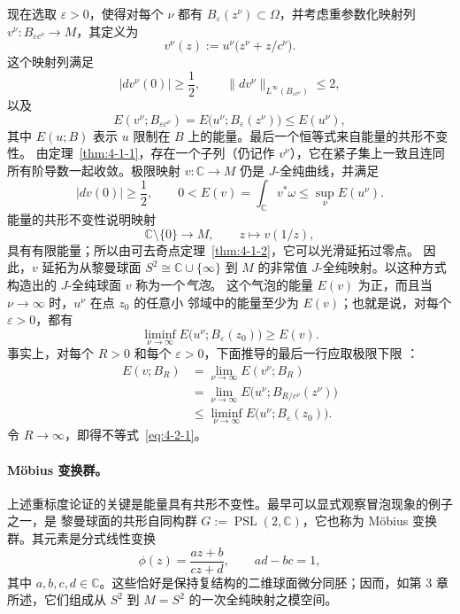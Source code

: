 现在选取 $\varepsilon>0$，使得对每个 $\nu$ 都有
$B_\varepsilon(z^\nu)\subset\Omega$，并考虑重参数化映射列
$v^\nu:B_{\varepsilon c^\nu}\to M$，其定义为
\[
  v^\nu(z):=u^\nu\bigl(z^\nu+z/c^\nu\bigr).
\]
这个映射列满足
\[
  |dv^\nu(0)|\ge\frac12,
  \qquad
  \lVert dv^\nu\rVert_{L^\infty(B_{\varepsilon c^\nu})}\le2,
\]
以及
\[
  E(v^\nu;B_{\varepsilon c^\nu})
  =E\bigl(u^\nu;B_\varepsilon(z^\nu)\bigr)
  \le E(u^\nu),
\]
其中 $E(u;B)$ 表示 $u$ 限制在 $B$ 上的能量。最后一个恒等式来自能量的共形不变性。
由定理~\ref{thm:4-1-1}，存在一个子列（仍记作 $v^\nu$），它在紧子集上一致且连同
所有阶导数一起收敛。极限映射 $v:\mathbb C\to M$ 仍是 $J$-全纯曲线，并满足
\[
  |dv(0)|\ge\frac12,
  \qquad
  0<E(v)=\int_{\mathbb C}v^*\omega
  \le\sup_\nu E(u^\nu).
\]
能量的共形不变性说明映射
\[
  \mathbb C\setminus\{0\}\longrightarrow M,
  \qquad z\longmapsto v(1/z),
\]
具有有限能量；所以由可去奇点定理~\ref{thm:4-1-2}，它可以光滑延拓过零点。
因此，$v$ 延拓为从黎曼球面 $S^2\cong\mathbb C\cup\{\infty\}$ 到 $M$ 的非常值
$J$-全纯映射。以这种方式构造出的 $J$-全纯球面 $v$ 称为一个\emph{气泡}。
这个气泡的能量 $E(v)$ 为正，而且当 $\nu\to\infty$ 时，$u^\nu$ 在点 $z_0$ 的任意小
邻域中的能量至少为 $E(v)$；也就是说，对每个 $\varepsilon>0$，都有
\begin{equation}\label{eq:4-2-1}
  \liminf_{\nu\to\infty}E\bigl(u^\nu;B_\varepsilon(z_0)\bigr)\ge E(v).
\end{equation}
事实上，对每个 $R>0$ 和每个 $\varepsilon>0$，下面推导的最后一行应取极限下限
：
\[
  \begin{aligned}
  E(v;B_R)
  &=\lim_{\nu\to\infty}E(v^\nu;B_R)\\
  &=\lim_{\nu\to\infty}
    E\bigl(u^\nu;B_{R/c^\nu}(z^\nu)\bigr)\\
  &\le\liminf_{\nu\to\infty}
    E\bigl(u^\nu;B_\varepsilon(z_0)\bigr).
  \end{aligned}
\]
令 $R\to\infty$，即得不等式~\eqref{eq:4-2-1}。

\paragraph{Möbius 变换群。}
上述重标度论证的关键是能量具有共形不变性。最早可以显式观察冒泡现象的例子之一，是
黎曼球面的共形自同构群
$G:=\operatorname{PSL}(2,\mathbb C)$，它也称为 Möbius 变换群。其元素是分式线性变换
\begin{equation}\label{eq:4-2-2}
  \phi(z)=\frac{az+b}{cz+d},
  \qquad ad-bc=1,
\end{equation}
其中 $a,b,c,d\in\mathbb C$。这些恰好是保持复结构的二维球面微分同胚；因而，如第 3 章
所述，它们组成从 $S^2$ 到 $M=S^2$ 的一次全纯映射之模空间。

